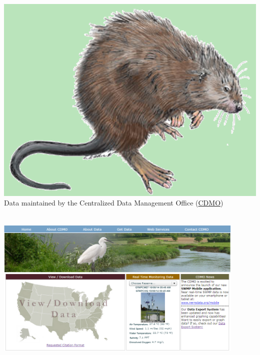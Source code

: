\documentclass[serif]{beamer}\usepackage[]{graphicx}\usepackage[]{color}
\begin{document}
\begin{frame}[t]{\includegraphics[width=0.05\paperwidth]{fig/muskrat.png}\hspace{0.07in}{\bf What is NERRS/SWMP?}}
Data maintained by the Centralized Data Management Office (\href{http://cdmo.baruch.sc.edu/}{CDMO})\\~\\
\centerline{\includegraphics[width = 0.9\textwidth]{fig/cdmo_front.png}}
\end{frame}
\end{document}
